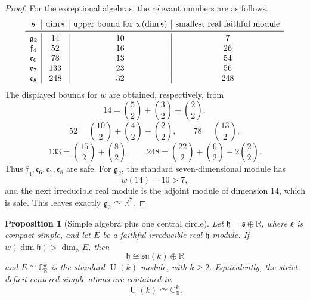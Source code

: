 \documentclass[11pt]{article}
\newtheorem{proposition}[theorem]{Proposition}
\theoremstyle{remark}
\newcommand{\RR}{\mathbb{R}}
\newcommand{\CC}{\mathbb{C}}
\newcommand{\fh}{\mathfrak{h}}
\newcommand{\fs}{\mathfrak{s}}
\newcommand{\su}{\mathfrak{su}}
\newcommand{\U}{\operatorname{U}}
\begin{document}
\begin{proof}
For the exceptional algebras, the relevant numbers are as follows.
\[
\begin{array}{c|c|c|c}
\fs & \dim\fs & \text{upper bound for } w(\dim\fs) & \text{smallest real faithful module}\\
\midrule
\mathfrak g_2 & 14  & 10 & 7\\
\mathfrak f_4 & 52  & 16 & 26\\
\mathfrak e_6 & 78  & 13 & 54\\
\mathfrak e_7 & 133 & 23 & 56\\
\mathfrak e_8 & 248 & 32 & 248
\end{array}
\]
The displayed bounds for \(w\) are obtained, respectively, from
\[
  14=\binom52+\binom32+\binom22,
\]
\[
  52=\binom{10}{2}+\binom42+\binom22,
  \qquad
  78=\binom{13}{2},
\]
\[
  133=\binom{15}{2}+\binom82,
  \qquad
  248=\binom{22}{2}+\binom62+2\binom22.
\]
Thus \(\mathfrak f_4,\mathfrak e_6,\mathfrak e_7,\mathfrak e_8\) are safe.  For \(\mathfrak g_2\), the standard seven-dimensional module has
\[
  w(14)=10>7,
\]
and the next irreducible real module is the adjoint module of dimension \(14\), which is safe.  This leaves exactly \(\mathfrak g_2\curvearrowright\RR^7\).
\end{proof}

\begin{proposition}[Simple algebra plus one central circle]\label{prop:centered-simple}
Let \(\fh=\fs\oplus\RR\), where \(\fs\) is compact simple, and let \(E\) be a faithful irreducible real \(\fh\)-module.  If \(w(\dim\fh)>\dim_{\RR}E\), then
\[
  \fh\cong \su(k)\oplus\RR
\]
and \(E\cong\CC^k_{\RR}\) is the standard \(\U(k)\)-module, with \(k\geq 2\).  Equivalently, the strict-deficit centered simple atoms are contained in
\[
  \U(k)\curvearrowright \CC^k_{\RR}.
\]
\end{proposition}
\end{document}
